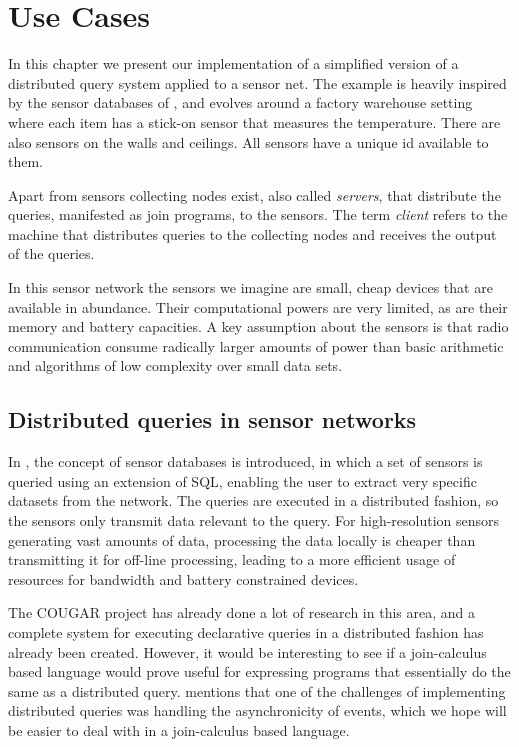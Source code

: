 
\section{Use Cases}

In this chapter we present our implementation of a simplified version of a
distributed query system applied to a sensor net. The example is heavily
inspired by the sensor databases of \cite{bonnet2001towards}, and evolves around
a factory warehouse setting where each item has a stick-on sensor that measures
the temperature. There are also sensors on the walls and ceilings. All sensors
have a unique id available to them.

Apart from sensors collecting nodes exist, also called \emph{servers}, that
distribute the queries, manifested as join programs, to the sensors. The term
\emph{client} refers to the machine that distributes queries to the collecting
nodes and receives the output of the queries.

In this sensor network the sensors we imagine are small, cheap devices that are
available in abundance. Their computational powers are very limited, as are
their memory and battery capacities. A key assumption about the sensors is that
radio communication consume radically larger amounts of power than basic
arithmetic and algorithms of low complexity over small data sets.

\subsection*{Distributed queries in sensor networks}

In \cite{bonnet2001towards}, the concept of sensor databases is introduced, in
which a set of sensors is queried using an extension of SQL, enabling the user
to extract very specific datasets from the network. The queries are executed in
a distributed fashion, so the sensors only transmit data relevant to the query.
For high-resolution sensors generating vast amounts of data, processing the
data locally is cheaper than transmitting it for off-line processing, leading
to a more efficient usage of resources for bandwidth and battery constrained
devices.

The COUGAR project\cite{COUGAR} has already done a lot of research in this
area, and a complete system for executing declarative queries in a distributed
fashion has already been created. However, it would be interesting to see if a
join-calculus based language would prove useful for expressing programs that
essentially do the same as a distributed query. \cite{bonnet2001towards}
mentions that one of the challenges of implementing distributed queries was
handling the asynchronicity of events, which we hope will be easier to deal
with in a join-calculus based language.

